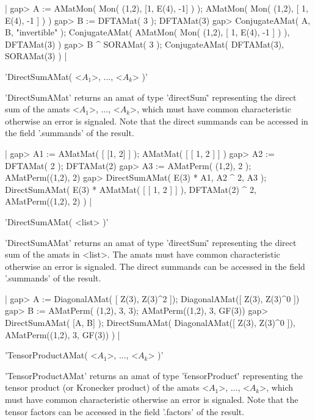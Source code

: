 |    gap> A := AMatMon( Mon( (1,2), [1, E(4), -1] ) );
    AMatMon( Mon(
      (1,2),
      [ 1, E(4), -1 ]
    ) )
    gap> B := DFTAMat( 3 );
    DFTAMat(3)
    gap> ConjugateAMat( A, B, "invertible" );
    ConjugateAMat(
      AMatMon( Mon(
        (1,2),
        [ 1, E(4), -1 ]
      ) ),
      DFTAMat(3)
    )
    gap> B ^ SORAMat( 3 );
    ConjugateAMat(
      DFTAMat(3),
      SORAMat(3)
    ) |


'DirectSumAMat( <$A_1$>, ..., <$A_k$> )'

'DirectSumAMat' returns an amat of type '\"directSum\"' representing
the direct sum of the amats <$A_1$>, ..., <$A_k$>, which must have 
common characteristic otherwise an error is signaled. Note that the direct 
summands can be accessed in the field '.summands' of the result.

|    gap> A1 := AMatMat( [ [1, 2] ] );
    AMatMat(
      [ [ 1, 2 ] ]
    )
    gap> A2 := DFTAMat( 2 );
    DFTAMat(2)
    gap> A3 := AMatPerm( (1,2), 2 );
    AMatPerm((1,2), 2)
    gap> DirectSumAMat( E(3) * A1, A2 ^ 2, A3 );
    DirectSumAMat(
      E(3) * AMatMat( [ [ 1, 2 ] ] ),
      DFTAMat(2) ^ 2,
      AMatPerm((1,2), 2)
    ) |

'DirectSumAMat( <list> )'

'DirectSumAMat' returns an amat of type '\"directSum\"' representing
the direct sum of the amats in <list>. The amats must have common
characteristic otherwise an error is signaled. The direct 
summands can be accessed in the field '.summands' of the result.

|    gap> A := DiagonalAMat( [ Z(3), Z(3)^2 ]);
    DiagonalAMat([ Z(3), Z(3)^0 ])
    gap> B := AMatPerm( (1,2), 3, 3);
    AMatPerm((1,2), 3, GF(3))
    gap> DirectSumAMat( [A, B] );    
    DirectSumAMat(
      DiagonalAMat([ Z(3), Z(3)^0 ]),
      AMatPerm((1,2), 3, GF(3))
    ) |


'TensorProductAMat( <$A_1$>, ..., <$A_k$> )'

'TensorProductAMat' returns an amat of type '\"tensorProduct\"' 
representing the tensor product (or Kronecker product) of the 
amats <$A_1$>, ..., <$A_k$>, 
which must have common characteristic otherwise an error is signaled.
Note that the tensor factors can be accessed in the field '.factors' of 
the result.

